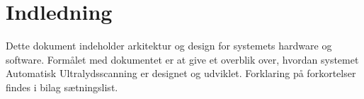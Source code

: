 \chapter{Indledning}\label{Indledning}

Dette dokument indeholder arkitektur og design for systemets hardware og software. 
Formålet med dokumentet er at give et overblik over, hvordan systemet Automatisk Ultralydsscanning er designet og udviklet. Forklaring på forkortelser findes i bilag  sætningslist. 
